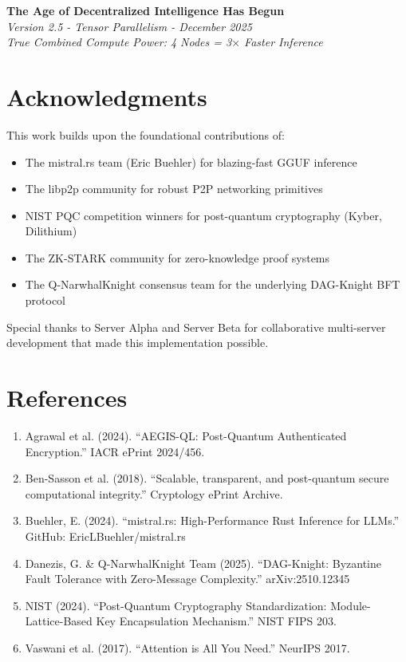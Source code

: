 \documentclass[11pt,a4paper]{article}
\begin{document}
\vspace{1cm}

\begin{center}
\large\textbf{The Age of Decentralized Intelligence Has Begun}\\
\normalsize\textit{Version 2.5 - Tensor Parallelism - December 2025}\\
\small\textit{True Combined Compute Power: 4 Nodes = 3$\times$ Faster Inference}
\end{center}

\newpage
\section*{Acknowledgments}

This work builds upon the foundational contributions of:
\begin{itemize}
    \item The mistral.rs team (Eric Buehler) for blazing-fast GGUF inference
    \item The libp2p community for robust P2P networking primitives
    \item NIST PQC competition winners for post-quantum cryptography (Kyber, Dilithium)
    \item The ZK-STARK community for zero-knowledge proof systems
    \item The Q-NarwhalKnight consensus team for the underlying DAG-Knight BFT protocol
\end{itemize}

Special thanks to Server Alpha and Server Beta for collaborative multi-server development that made this implementation possible.

\section*{References}

\begin{enumerate}
    \item Agrawal et al. (2024). ``AEGIS-QL: Post-Quantum Authenticated Encryption.'' IACR ePrint 2024/456.
    \item Ben-Sasson et al. (2018). ``Scalable, transparent, and post-quantum secure computational integrity.'' Cryptology ePrint Archive.
    \item Buehler, E. (2024). ``mistral.rs: High-Performance Rust Inference for LLMs.'' GitHub: EricLBuehler/mistral.rs
    \item Danezis, G. \& Q-NarwhalKnight Team (2025). ``DAG-Knight: Byzantine Fault Tolerance with Zero-Message Complexity.'' arXiv:2510.12345
    \item NIST (2024). ``Post-Quantum Cryptography Standardization: Module-Lattice-Based Key Encapsulation Mechanism.'' NIST FIPS 203.
    \item Vaswani et al. (2017). ``Attention is All You Need.'' NeurIPS 2017.
\end{enumerate}
\end{document}
